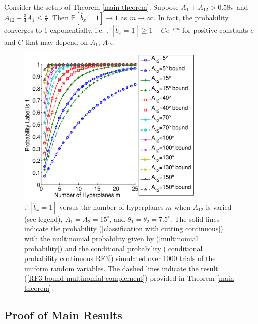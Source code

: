 \documentclass[twoside,11pt]{article}
\newcommand{\edit}[1]{{{#1}}}
\begin{document}
\begin{corollary}\label{Corollary 2}
Consider the setup of Theorem \ref{main theorem}. Suppose $A_1 + A_{12} > 0.58 \pi$ and $A_{12} + \frac{3}{4}A_1 \leq \frac{\pi}{2}$. Then $\mathbb{P}[\widehat{b}_x = 1] \rightarrow 1$ as $m\rightarrow \infty$.  \edit{In fact, the probability converges to $1$ exponentially, i.e. $\mathbb{P}[\hat{b}_x =1] \geq 1-Ce^{-c m}$ for positive constants $c$ and $C$ that may depend on $A_1$, $A_{12}$.}
\end{corollary}



\begin{figure}[!htbp]
\centering
\includegraphics[height=3in]{images/Theory/theory_1.eps}
\caption{$\mathbb{P}[\widehat{b}_x = 1]$ versus the number of hyperplanes $m$ when $A_{12}$ is varied (see legend), $A_1 = A_2 = 15^\circ$, and $\theta_1 = \theta_2 = 7.5^\circ$. The solid lines indicate the probability (\ref{classification with cutting continuous}) with the multinomial probability given by (\ref{multinomial probability}) and the conditional probability (\ref{conditional probability continuous RF3}) simulated over 1000 trials of the uniform random variables. The dashed lines indicate the result (\ref{RF3 bound multinomial complement}) provided in Theorem \ref{main theorem}.}
\label{theorem figure}
\end{figure}
\subsection{Proof of Main Results}
\end{document}
